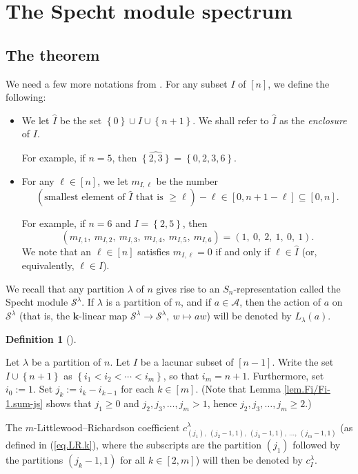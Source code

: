 \documentclass[numbers=enddot,12pt,final,onecolumn,notitlepage]{scrartcl}%
\theoremstyle{definition}
\newtheorem{defi}[theo]{Definition}
\newenvironment{definition}[1][]
{\begin{defi}[#1]\begin{leftbar}}
{\end{leftbar}\end{defi}}
\begin{document}
\section{\label{sec.specht-spec}The Specht module spectrum}

\subsection{\label{subsec.specht-spec.thm}The theorem}

We need a few more notations from \cite{s2b1}. For any subset $I$ of $\left[
n\right]  $, we define the following:

\begin{itemize}
\item We let $\widehat{I}$ be the set $\left\{  0\right\}  \cup I\cup\left\{
n+1\right\}  $. We shall refer to $\widehat{I}$ as the \emph{enclosure} of $I$.

For example, if $n=5$, then $\widehat{\left\{  2,3\right\}  }=\left\{
0,2,3,6\right\}  $.

\item For any $\ell\in\left[  n\right]  $, we let $m_{I,\ell}$ be the number%
\[
\left(  \text{smallest element of }\widehat{I}\text{ that is }\geq\ell\right)
-\ell\in\left[  0,n+1-\ell\right]  \subseteq\left[  0,n\right]  .
\]


For example, if $n=6$ and $I=\left\{  2,5\right\}  $, then%
\[
\left(  m_{I,1},\ m_{I,2},\ m_{I,3},\ m_{I,4},\ m_{I,5},\ m_{I,6}\right)
=\left(  1,\ 0,\ 2,\ 1,\ 0,\ 1\right)  .
\]
We note that an $\ell\in\left[  n\right]  $ satisfies $m_{I,\ell}=0$ if and
only if $\ell\in\widehat{I}$ (or, equivalently, $\ell\in I$).
\end{itemize}

We recall that any partition $\lambda$ of $n$ gives rise to an $S_{n}%
$-representation called the Specht module $\mathcal{S}^{\lambda}$. If
$\lambda$ is a partition of $n$, and if $a\in\mathcal{A}$, then the action of
$a$ on $\mathcal{S}^{\lambda}$ (that is, the $\mathbf{k}$-linear map
$\mathcal{S}^{\lambda}\rightarrow\mathcal{S}^{\lambda},\ w\mapsto aw$) will be
denoted by $L_{\lambda}\left(  a\right)  $.

\begin{definition}
\label{def.clI}Let $\lambda$ be a partition of $n$. Let $I$ be a lacunar
subset of $\left[  n-1\right]  $. Write the set $I\cup\left\{  n+1\right\}  $
as $\left\{  i_{1}<i_{2}<\cdots<i_{m}\right\}  $, so that $i_{m}=n+1$.
Furthermore, set $i_{0}:=1$. Set $j_{k}:=i_{k}-i_{k-1}$ for each $k\in\left[
m\right]  $. (Note that Lemma \ref{lem.Fi/Fi-1.sum-js} shows that $j_{1}\geq0$
and $j_{2},j_{3},\ldots,j_{m}>1$, hence $j_{2},j_{3},\ldots,j_{m}\geq2$.)

The $m$-Littlewood--Richardson coefficient $c_{\left(  j_{1}\right)
,\ \left(  j_{2}-1,1\right)  ,\ \left(  j_{3}-1,1\right)  ,\ \ldots,\ \left(
j_{m}-1,1\right)  }^{\lambda}$ (as defined in (\ref{eq.LR.k}), where the
subscripts are the partition $\left(  j_{1}\right)  $ followed by the
partitions $\left(  j_{k}-1,1\right)  $ for all $k\in\left[  2,m\right]  $)
will then be denoted by $c_{I}^{\lambda}$.
\end{definition}
\end{document}
